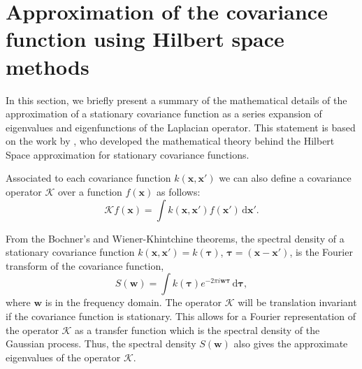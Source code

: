 \documentclass[onecolumn,a4paper,11pt]{article}
\begin{document}
\appendix


\section{Approximation of the covariance function using Hilbert space methods} \label{ch5_app_approx_covfun}


In this section, we briefly present a summary of the mathematical details of the approximation of a stationary covariance function as a series expansion of eigenvalues and eigenfunctions of the Laplacian operator. This statement is based on the work by \citet{solin2018hilbert}, who developed the mathematical theory behind the Hilbert Space approximation for stationary covariance functions.

Associated to each covariance function $k(\bm{x},\bm{x}')$ we can also define a covariance operator $\mathcal{K}$ over a function $f(\bm{x})$ as follows:
%
\begin{equation*}
\mathcal{K} f(\bm{x}) = \int k(\bm{x},\bm{x}') f(\bm{x}') \,\mathrm{d}\bm{x}'.
\end{equation*} 

From the Bochner’s and Wiener-Khintchine theorems, the spectral density of a stationary covariance function $k(\bm{x},\bm{x}') = k(\bm{\tau})$, $\bm{\tau}=(\bm{x}-\bm{x}')$, is the Fourier transform of the covariance function,
%
\begin{equation*}
S(\bm{w}) = \int k(\bm{\tau}) e^{-2\pi i \bm{w} \bm{\tau}} \,\mathrm{d}\bm{\tau}, \nonumber
\end{equation*}
where $\bm{w}$ is in the frequency domain. The operator $\mathcal{K}$ will be translation invariant if the covariance function is stationary. This allows for a Fourier representation of the operator $\mathcal{K}$ as a transfer function which is the spectral density of the Gaussian process. 
%
Thus, the spectral density $S(\bm{w})$ also gives the approximate eigenvalues of the operator $\mathcal{K}$.
\end{document}

